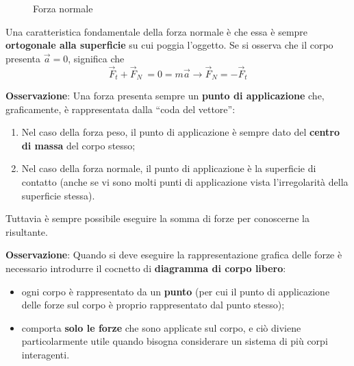 \documentclass[a4paper]{extarticle}
\newcommand{\quotes}[1]{``#1''}
\begin{document}
\vspace{1em}
\begin{figure}[H]
  \centering
  \caption{Forza normale}
  \label{fig:forza_normale}
\end{figure}

\vspace{1em}
\noindent
Una caratteristica fondamentale della forza normale è che essa è sempre \textbf{ortogonale alla superficie} su cui poggia l'oggetto. Se si osserva che il corpo presenta $\vec{a}=0$, significa che
\[\vec{F}_t + \vec{F}_N\ = 0 = m \vec{a} \longrightarrow \vec{F}_N = - \vec{F}_t\]

\vspace{1em}
\noindent
\textbf{Osservazione}: Una forza presenta sempre un \textbf{punto di applicazione} che, graficamente, è rappresentata dalla \quotes{coda del vettore}:
\begin{enumerate}
  \item Nel caso della forza peso, il punto di applicazione è sempre dato del \textbf{centro di massa} del corpo stesso;
  \item Nel caso della forza normale, il punto di applicazione è la superficie di contatto (anche se vi sono molti punti di applicazione vista l'irregolarità della superficie stessa).
\end{enumerate}
Tuttavia è sempre possibile eseguire la somma di forze per conoscerne la risultante.

\vspace{1em}
\noindent
\textbf{Osservazione}: Quando si deve eseguire la rappresentazione grafica delle forze è necessario introdurre il cocnetto di \textbf{diagramma di corpo libero}:
\begin{itemize}
  \item ogni corpo è rappresentato da un \textbf{punto} (per cui il punto di applicazione delle forze sul corpo è proprio rappresentato dal punto stesso);
  \item comporta \textbf{solo le forze} che sono applicate sul corpo, e ciò diviene particolarmente utile quando bisogna considerare un sistema di più corpi interagenti.
\end{itemize}
\end{document}
